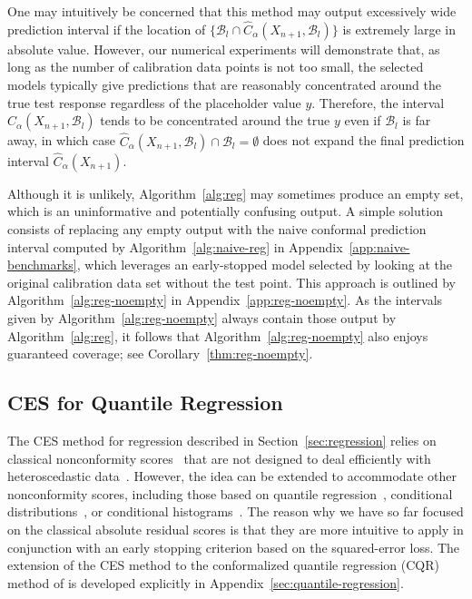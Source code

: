 One may intuitively be concerned that this method may output excessively wide prediction interval if the location of $\{\mathcal{B}_l \cap \hat{C}_\alpha(X_{n+1}, \mathcal{B}_l)\}$ is extremely large in absolute value.
However, our numerical experiments will demonstrate that, as long as the number of calibration data points is not too small, the selected models typically give predictions that are reasonably concentrated around the true test response regardless of the placeholder value $y$. Therefore, the interval $\hat{C}_\alpha(X_{n+1}, \mathcal{B}_l)$ tends to be concentrated around the true $y$ even if $\mathcal{B}_l$ is far away, in which case $\hat{C}_\alpha(X_{n+1}, \mathcal{B}_l) \cap \mathcal{B}_l = \emptyset$ does not expand the final prediction interval $\hat{C}_\alpha(X_{n+1})$.


Although it is unlikely, Algorithm~\ref{alg:reg} may sometimes produce an empty set, which is an uninformative and potentially confusing output. A simple solution consists of replacing any empty output with the naive conformal prediction interval computed by Algorithm~\ref{alg:naive-reg} in Appendix~\ref{app:naive-benchmarks}, which leverages an early-stopped model selected by looking at the original calibration data set without the test point.
This approach is outlined by Algorithm~\ref{alg:reg-noempty} in Appendix~\ref{app:reg-noempty}.
As the intervals given by Algorithm~\ref{alg:reg-noempty} always contain those output by Algorithm~\ref{alg:reg}, it follows that Algorithm~\ref{alg:reg-noempty} also enjoys guaranteed coverage; see Corollary~\ref{thm:reg-noempty}.


\subsection{CES for Quantile Regression} \label{sec:regression-cqr-short}

The CES method for regression described in Section~\ref{sec:regression} relies on classical nonconformity scores~\cite{vovk2005algorithmic,lei2016RegressionPS} that are not designed to deal efficiently with heteroscedastic data~\cite{romano2019conformalized,sesia2020comparison}.
However, the idea can be extended to accommodate other nonconformity scores, including those based on quantile regression~\cite{romano2019conformalized}, conditional distributions~\cite{chernozhukov2019distributional,izbicki2019flexible}, or conditional histograms~\cite{sesia2021conformal}.
The reason why we have so far focused on the classical absolute residual scores is that they are more intuitive to apply in conjunction with an early stopping criterion based on the squared-error loss.
The extension of the CES method to the conformalized quantile regression (CQR) method of \citet{romano2019conformalized} is developed explicitly in Appendix~\ref{sec:quantile-regression}.


